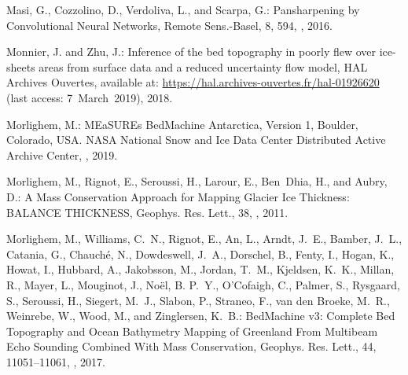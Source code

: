 \documentclass[tc, noline]{copernicus}
\begin{document}
\begin{thebibliography}{95}
Masi, G., Cozzolino, D., Verdoliva, L., and Scarpa, G.:
Pansharpening by Convolutional Neural Networks,
Remote Sens.-Basel,
8, 594, , 2016.

Monnier, J. and Zhu, J.: Inference of the bed topography in poorly flew over ice-sheets areas from surface data and a reduced uncertainty flow model, HAL Archives Ouvertes, available at: \url{https://hal.archives-ouvertes.fr/hal-01926620} (last access: 7~March~2019), 2018.

Morlighem, M.: MEaSUREs BedMachine Antarctica, Version 1, Boulder, Colorado, USA. NASA National Snow and Ice Data Center Distributed Active Archive Center, , 2019.

Morlighem, M., Rignot, E., Seroussi, H., Larour, E., Ben~Dhia, H., and Aubry, D.:
A Mass Conservation Approach for Mapping Glacier Ice Thickness: BALANCE THICKNESS,
Geophys. Res. Lett.,
38, , 2011.

Morlighem, M., Williams, C.~N., Rignot, E., An, L., Arndt, J.~E., Bamber, J.~L., Catania, G., Chauch{\'e}, N., Dowdeswell, J.~A., Dorschel, B., Fenty, I., Hogan, K., Howat, I., Hubbard, A., Jakobsson, M., Jordan, T.~M., Kjeldsen, K.~K., Millan, R., Mayer, L., Mouginot, J., No{\"e}l, B. P.~Y., O'Cofaigh, C., Palmer, S., Rysgaard, S., Seroussi, H., Siegert, M.~J., Slabon, P., Straneo, F., {van den Broeke}, M.~R., Weinrebe, W., Wood, M., and Zinglersen, K.~B.:
BedMachine v3: Complete Bed Topography and Ocean Bathymetry Mapping of Greenland From Multibeam Echo Sounding Combined With Mass Conservation,
Geophys. Res. Lett.,
44, 11051--11061, , 2017.


\end{thebibliography}
\end{document}
